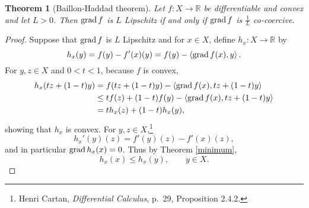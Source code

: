 \documentclass{article}
\newcommand{\inner}[2]{\left\langle #1, #2 \right\rangle}
\newcommand{\grad}{\ensuremath\mathrm{grad}\,}
\newtheorem{theorem}{Theorem}
\theoremstyle{definition}
\begin{document}
\begin{theorem}[Baillon-Haddad theorem]
Let $f:X \to \mathbb{R}$ be differentiable and convex and let $L>0$. 
Then $\grad f$ is $L$ Lipschitz if and only if $\grad f$ is $\frac{1}{L}$ co-coercive. 
\end{theorem}
\begin{proof}
Suppose that $\grad f$ is $L$ Lipschitz and
for $x \in X$, define $h_x:X \to \mathbb{R}$ by
\[
h_x(y) = f(y)-f'(x)(y) = f(y)-\inner{\grad f(x)}{y}.
\]
For $y,z \in X$ and $0<t<1$, because $f$ is convex,
\begin{align*}
h_x(tz+(1-t)y)&= f(tz+(1-t)y)-\inner{\grad f(x)}{tz+(1-t)y}\\
&\leq tf(z)+(1-t)f(y) - \inner{\grad f(x)}{tz+(1-t)y}\\
&=th_x(z)+(1-t)h_x(y),
\end{align*}
showing that $h_x$ is convex. For $y,z \in X$,\footnote{Henri Cartan, {\em Differential Calculus},
p.~29, Proposition 2.4.2.}
\[
h_x'(y)(z)=f'(y)(z)-f'(x)(z),
\]
and in particular $\grad h_x(x)=0$. Thus by Theorem \ref{minimum}, 
\begin{equation}
h_x(x) \leq h_x(y), \qquad y \in X.
\label{hx}
\end{equation}



\end{proof}
\end{document}
